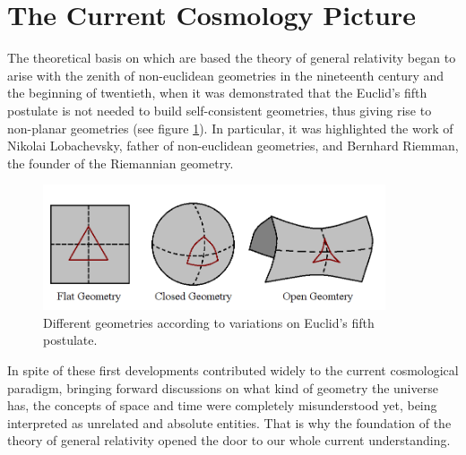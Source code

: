 



\section{The Current Cosmology Picture }
\label{sec:TheCurrentCosmologyPicture}


The theoretical basis on which are based the theory of general relativity
began to arise with the zenith of non-euclidean geometries in the 
nineteenth century and the beginning of twentieth, when it was demonstrated 
that the Euclid's fifth postulate is not needed to build self-consistent 
geometries, thus giving rise to non-planar geometries (see figure 
\ref{fig:NonEuclidean}). In particular, it was highlighted the work of 
Nikolai Lobachevsky, father of non-euclidean geometries, and Bernhard 
Riemman, the founder of the Riemannian geometry.


\begin{figure}[htbp]
	\centering
	\includegraphics[width=0.9\textwidth]
	{./figures/1_introduction/Non_Euclidean.png}
	
	\caption{\small{Different geometries according to variations on	
	Euclid's fifth postulate.}}
	
	\label{fig:NonEuclidean}
\end{figure}


In spite of these first developments contributed widely to the current 
cosmological paradigm, bringing forward discussions on what kind of 
geometry the universe has, the concepts of space and time were completely 
misunderstood yet, being interpreted as unrelated and absolute entities.
That is why the foundation of the theory of general relativity opened the
door to our whole current understanding.



